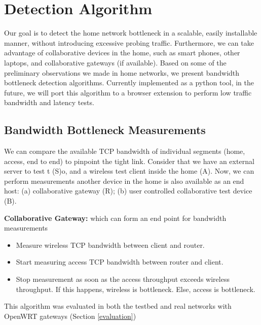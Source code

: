 \section{Detection Algorithm}

Our goal is to detect the home network bottleneck in a scalable, easily installable manner, without introducing excessive probing traffic. Furthermore, we can take advantage of collaborative devices in the home, such as smart phones, other laptops, and collaborative gateways (if available). Based on some of the preliminary observations we made in home networks, we present bandwidth bottleneck detection algorithms. Currently implemented as a python tool, in the future, we will port this algorithm to a browser extension to perform low traffic bandwidth and latency tests.

\subsection{Bandwidth Bottleneck Measurements}
\label{bandwidth}

We can compare the available TCP bandwidth of individual segments (home, access, end to end) to pinpoint the tight link. Consider that we have an external server to test t (S)o, and a wireless test client inside the home (A). Now, we can perform measurements another device in the home is also available as an end host: (a) collaborative gateway (R); (b) user controlled collaborative test device (B).

\textbf{Collaborative Gateway:} which can form an end point for bandwidth measurements
\begin{itemize}[noitemsep,topsep=0pt,parsep=0pt,partopsep=0pt]
\item Measure wireless TCP bandwidth between client and router.
\item Start measuring access TCP bandwidth between router and client.
\item Stop measurement as soon as the access throughput exceeds wireless throughput. If this happens, wireless is bottleneck. Else, access is bottleneck.
\end{itemize}
This algorithm was evaluated in both the testbed and real networks with OpenWRT gateways (Section \ref{evaluation})

